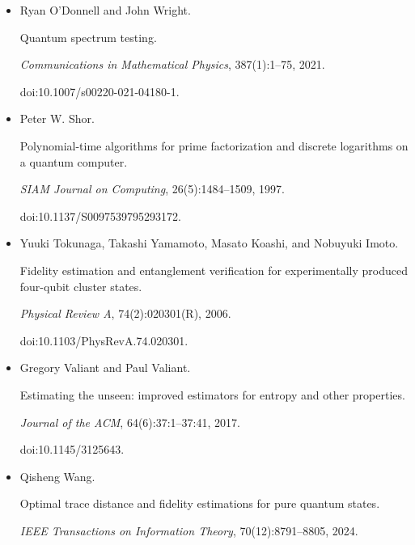 \documentclass[10pt,a4paper]{article}
\begin{document}
\begin{itemize}
doi:10.1145/2897518.2897544.





\item[] 
[35]

Ryan O’Donnell and John Wright.


Quantum spectrum testing.


\emph{Communications in Mathematical Physics}, 387(1):1–75, 2021.


doi:10.1007/s00220-021-04180-1.





\item[] 
[36]

Peter W. Shor.


Polynomial-time algorithms for prime factorization and discrete
logarithms on a quantum computer.


\emph{SIAM Journal on Computing}, 26(5):1484–1509, 1997.


doi:10.1137/S0097539795293172.





\item[] 
[37]

Yuuki Tokunaga, Takashi Yamamoto, Masato Koashi, and Nobuyuki Imoto.


Fidelity estimation and entanglement verification for experimentally
produced four-qubit cluster states.


\emph{Physical Review A}, 74(2):020301(R), 2006.


doi:10.1103/PhysRevA.74.020301.





\item[] 
[38]

Gregory Valiant and Paul Valiant.


Estimating the unseen: improved estimators for entropy and other
properties.


\emph{Journal of the ACM}, 64(6):37:1–37:41, 2017.


doi:10.1145/3125643.





\item[] 
[39]

Qisheng Wang.


Optimal trace distance and fidelity estimations for pure quantum
states.


\emph{IEEE Transactions on Information Theory}, 70(12):8791–8805,
2024.



\end{itemize}
\end{document}
